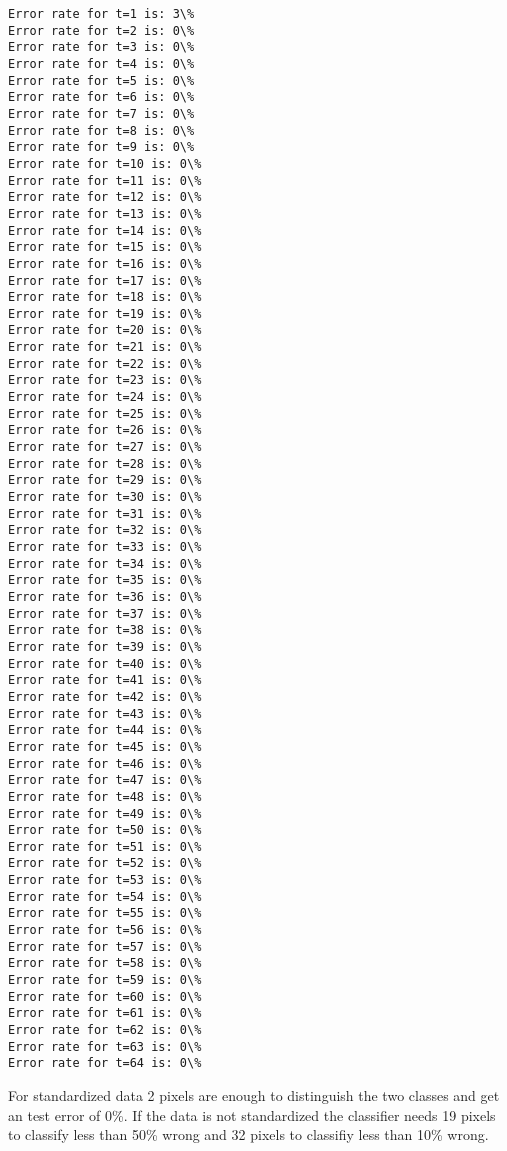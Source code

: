 \documentclass[11pt]{article}
\begin{document}
    \begin{Verbatim}[commandchars=\\\{\}]
Error rate for t=1 is: 3\%
Error rate for t=2 is: 0\%
Error rate for t=3 is: 0\%
Error rate for t=4 is: 0\%
Error rate for t=5 is: 0\%
Error rate for t=6 is: 0\%
Error rate for t=7 is: 0\%
Error rate for t=8 is: 0\%
Error rate for t=9 is: 0\%
Error rate for t=10 is: 0\%
Error rate for t=11 is: 0\%
Error rate for t=12 is: 0\%
Error rate for t=13 is: 0\%
Error rate for t=14 is: 0\%
Error rate for t=15 is: 0\%
Error rate for t=16 is: 0\%
Error rate for t=17 is: 0\%
Error rate for t=18 is: 0\%
Error rate for t=19 is: 0\%
Error rate for t=20 is: 0\%
Error rate for t=21 is: 0\%
Error rate for t=22 is: 0\%
Error rate for t=23 is: 0\%
Error rate for t=24 is: 0\%
Error rate for t=25 is: 0\%
Error rate for t=26 is: 0\%
Error rate for t=27 is: 0\%
Error rate for t=28 is: 0\%
Error rate for t=29 is: 0\%
Error rate for t=30 is: 0\%
Error rate for t=31 is: 0\%
Error rate for t=32 is: 0\%
Error rate for t=33 is: 0\%
Error rate for t=34 is: 0\%
Error rate for t=35 is: 0\%
Error rate for t=36 is: 0\%
Error rate for t=37 is: 0\%
Error rate for t=38 is: 0\%
Error rate for t=39 is: 0\%
Error rate for t=40 is: 0\%
Error rate for t=41 is: 0\%
Error rate for t=42 is: 0\%
Error rate for t=43 is: 0\%
Error rate for t=44 is: 0\%
Error rate for t=45 is: 0\%
Error rate for t=46 is: 0\%
Error rate for t=47 is: 0\%
Error rate for t=48 is: 0\%
Error rate for t=49 is: 0\%
Error rate for t=50 is: 0\%
Error rate for t=51 is: 0\%
Error rate for t=52 is: 0\%
Error rate for t=53 is: 0\%
Error rate for t=54 is: 0\%
Error rate for t=55 is: 0\%
Error rate for t=56 is: 0\%
Error rate for t=57 is: 0\%
Error rate for t=58 is: 0\%
Error rate for t=59 is: 0\%
Error rate for t=60 is: 0\%
Error rate for t=61 is: 0\%
Error rate for t=62 is: 0\%
Error rate for t=63 is: 0\%
Error rate for t=64 is: 0\%

    \end{Verbatim}

    For standardized data 2 pixels are enough to distinguish the two classes
and get an test error of 0\%. If the data is not standardized the
classifier needs 19 pixels to classify less than 50\% wrong and 32
pixels to classifiy less than 10\% wrong.
\end{document}
